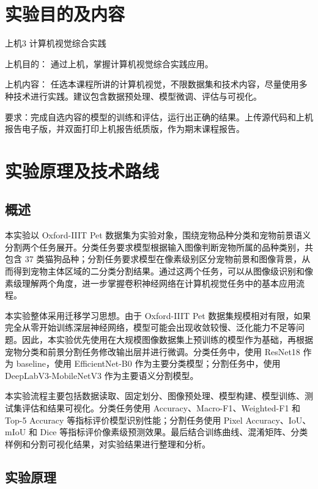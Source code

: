 \documentclass[UTF8,a4paper,12pt]{ctexart}
\begin{document}
\setcounter{page}{2}
\tableofcontents
\clearpage

\section{实验目的及内容}

\begingroup
\setlength{\parindent}{0pt}
上机3  计算机视觉综合实践

上机目的： 通过上机，掌握计算机视觉综合实践应用。

上机内容： 任选本课程所讲的计算机视觉，不限数据集和技术内容，尽量使用多种技术进行实践。建议包含数据预处理、模型微调、评估与可视化。

要求：完成自选内容的模型的训练和评估，运行出正确的结果。上传源代码和上机报告电子版，并双面打印上机报告纸质版，作为期末课程报告。
\endgroup

\section{实验原理及技术路线}
\label{sec:principle-route}

\subsection{概述}
\label{sec:principle-overview}

本实验以 Oxford-IIIT Pet 数据集为实验对象，围绕宠物品种分类和宠物前景语义分割两个任务展开。分类任务要求模型根据输入图像判断宠物所属的品种类别，共包含 37 类猫狗品种；分割任务要求模型在像素级别区分宠物前景和图像背景，从而得到宠物主体区域的二分类分割结果。通过这两个任务，可以从图像级识别和像素级理解两个角度，进一步掌握卷积神经网络在计算机视觉任务中的基本应用流程。

本实验整体采用迁移学习思想。由于 Oxford-IIIT Pet 数据集规模相对有限，如果完全从零开始训练深层神经网络，模型可能会出现收敛较慢、泛化能力不足等问题。因此，本实验优先使用在大规模图像数据集上预训练的模型作为基础，再根据宠物分类和前景分割任务修改输出层并进行微调。分类任务中，使用 ResNet18 作为 baseline，使用 EfficientNet-B0 作为主要分类模型；分割任务中，使用 DeepLabV3-MobileNetV3 作为主要语义分割模型。

本实验流程主要包括数据读取、固定划分、图像预处理、模型构建、模型训练、测试集评估和结果可视化。分类任务使用 Accuracy、Macro-F1、Weighted-F1 和 Top-5 Accuracy 等指标评价模型识别性能；分割任务使用 Pixel Accuracy、IoU、mIoU 和 Dice 等指标评价像素级预测效果。最后结合训练曲线、混淆矩阵、分类样例和分割可视化结果，对实验结果进行整理和分析。

\subsection{实验原理}
\label{sec:principle-theory}
\end{document}

